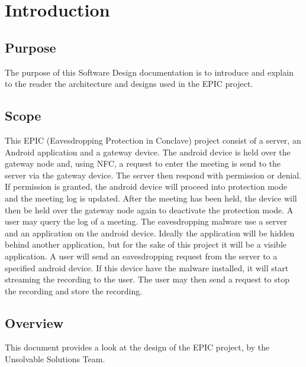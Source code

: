 \documentclass[a4paper,12pt,titlepage]{article}
\begin{document}
	
	
	\newpage
	\tableofcontents

\newpage\section{Introduction}
	\subsection{Purpose} The purpose of this Software Design documentation is to introduce and explain to the reader the architecture and designs used in the EPIC project. 

	\subsection{Scope}
This EPIC (Eavesdropping Protection in Conclave) project consist of a server, an Android application and a gateway device. The android device is held over the gateway node and, using NFC, a request to enter the meeting is send to the server via the gateway device. The server then respond with permission or denial. If permission is granted, the android device will proceed into protection mode and the meeting log is updated. After the meeting has been held, the device will then be held over the gateway node again to deactivate the protection mode. A user may query the log of a meeting.
\newline
The eavesdropping malware use a server and an application on the android device. Ideally the application will be hidden behind another application, but for the sake of this project it will be a visible application. A user will send an eavesdropping request from the server to a specified android device. If this device have the malware installed, it will start streaming the recording to the user. The user may then send a request to stop the recording and store the recording.

	\subsection{Overview} This document provides a look at the design of the EPIC project, by the Unsolvable Solutions Team. 

\end{document}
